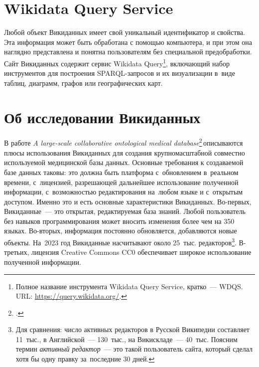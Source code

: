 \section{Wikidata Query Service}
\label{sect:WDQS}

Любой объект Викиданных имеет свой уникальный идентификатор и свойства. 
Эта информация может быть обработана с помощью компьютера, 
и при этом она наглядно представлена и понятна пользователям без специальной предобработки. 
Сайт Викиданных содержит сервис Wikidata Query\footnote{%
%
Полное название инструмента Wikidata Query Service, кратко~--- WDQS. URL: 
\href{https://query.wikidata.org/}{https://query.wikidata.org/}.%
%
}, включающий набор инструментов для построения SPARQL-запросов 
и их визуализации в~виде таблиц, диаграмм, графов или географических карт.



\section{Об исследовании Викиданных}

В работе \textit{A large-scale collaborative ontological medical database}\footnote{%
.}\,описываются плюсы использования Викиданных для создания крупномасштабной 
совместно используемой медицинской базы данных. 
Основные требования к создаваемой базе данных таковы: 
это должна быть платформа с~обновлением в~реальном времени, 
с~лицензией, разрешающей дальнейшее использование полученной информации, 
с~возможностью редактирования на~любом языке и с~открытым доступом. 
Именно это и есть основные характеристики Викиданных. 
Во-первых, Викиданные~--- это открытая, редактируемая база знаний. 
Любой пользователь без навыков программирования может вносить изменения 
более чем на 350 языках. 
Во-вторых, информация постоянно обновляется, добавляются новые объекты. 
На~2023 год Викиданные насчитывают около 25~тыс. редакторов\footnote{Для сравнения: 
число активных редакторов в Русской Википедии 
составляет 11~тыс., в Английской~--- 130~тыс., на Викискладе~--- 40~тыс. 
Поясним термин \emph{активный редактор}~--- это такой пользователь сайта, 
который сделал хотя бы одну правку за~последние 30 дней.}. 
В-третьих, лицензия Creative Commons CC0 обеспечивает широкое использование полученной информации. 

